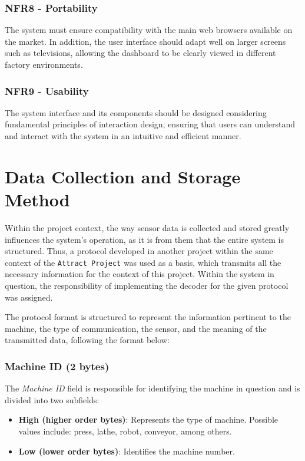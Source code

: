 \subsubsection{NFR8 - Portability}
The system must ensure compatibility with the main web browsers available on the market. In addition, the user interface should adapt well on larger screens such as televisions, allowing the dashboard to be clearly viewed in different factory environments.

\subsubsection{NFR9 - Usability}The system interface and its components should be designed considering fundamental principles of interaction design, ensuring that users can understand and interact with the system in an intuitive and efficient manner.

\section[Data Collection and Storage Method]{Data Collection and Storage Method}

Within the project context, the way sensor data is collected and stored greatly influences the system's operation, as it is from them that the entire system is structured. Thus, a protocol developed in another project within the same context of the \texttt{Attract Project} was used as a basis, which transmits all the necessary information for the context of this project. Within the system in question, the responsibility of implementing the decoder for the given protocol was assigned.

The protocol format is structured to represent the information pertinent to the machine, the type of communication, the sensor, and the meaning of the transmitted data, following the format below:

\subsubsection{Machine ID (2 bytes)}

The \textit{Machine ID} field is responsible for identifying the machine in question and is divided into two subfields:

\begin{itemize}
    \item \textbf{High (higher order bytes)}: Represents the type of machine. Possible values include: press, lathe, robot, conveyor, among others.
    \item \textbf{Low (lower order bytes)}: Identifies the machine number.
\end{itemize}

